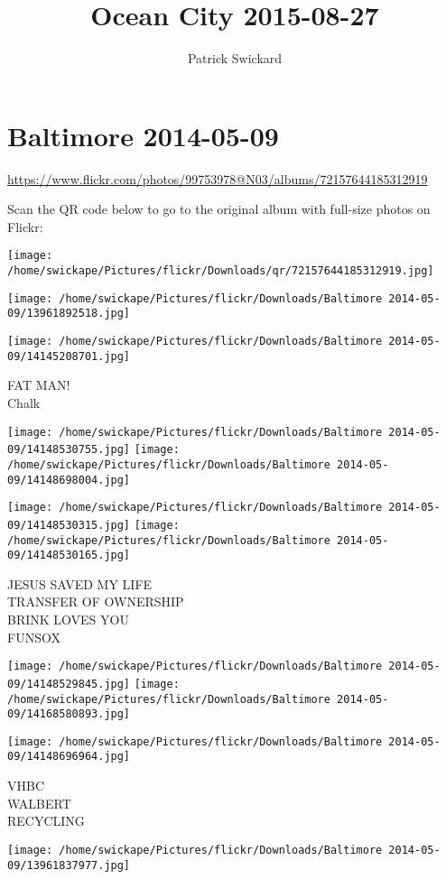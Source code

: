 \documentclass[10pt,letterpaper]{article}
\title{Ocean City 2015-08-27}
\author{Patrick Swickard}
\date{}
\begin{document}
\section*{Baltimore 2014-05-09}

\url{https://www.flickr.com/photos/99753978@N03/albums/72157644185312919}

Scan the QR code below to go to the original album with full-size photos on Flickr:

\texttt{[image: /home/swickape/Pictures/flickr/Downloads/qr/72157644185312919.jpg]}
\pagebreak

\texttt{[image: /home/swickape/Pictures/flickr/Downloads/Baltimore 2014-05-09/13961892518.jpg]}

\vspace{0.25in}
\texttt{[image: /home/swickape/Pictures/flickr/Downloads/Baltimore 2014-05-09/14145208701.jpg]}

FAT MAN!\\
Chalk
\pagebreak

\texttt{[image: /home/swickape/Pictures/flickr/Downloads/Baltimore 2014-05-09/14148530755.jpg]}
\texttt{[image: /home/swickape/Pictures/flickr/Downloads/Baltimore 2014-05-09/14148698004.jpg]}

\texttt{[image: /home/swickape/Pictures/flickr/Downloads/Baltimore 2014-05-09/14148530315.jpg]}
\texttt{[image: /home/swickape/Pictures/flickr/Downloads/Baltimore 2014-05-09/14148530165.jpg]}

JESUS SAVED MY LIFE\\
TRANSFER OF OWNERSHIP\\
BRINK LOVES YOU\\
FUNSOX
\pagebreak

\texttt{[image: /home/swickape/Pictures/flickr/Downloads/Baltimore 2014-05-09/14148529845.jpg]}
\texttt{[image: /home/swickape/Pictures/flickr/Downloads/Baltimore 2014-05-09/14168580893.jpg]}

\texttt{[image: /home/swickape/Pictures/flickr/Downloads/Baltimore 2014-05-09/14148696964.jpg]}

VHBC\\
WALBERT\\
RECYCLING
\pagebreak

\texttt{[image: /home/swickape/Pictures/flickr/Downloads/Baltimore 2014-05-09/13961837977.jpg]}
\end{document}
